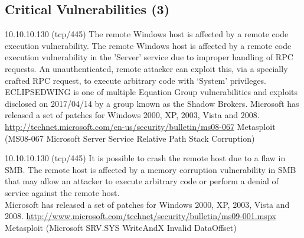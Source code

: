
\subsection{Critical Vulnerabilities (3)}
\begin{tcolorbox}[
	title=MS08-067: Microsoft Windows Server Service Crafted RPC Request Handling Remote Code Execution (958644) (uncredentialed check) - Nessus Plugin ID 34477,
	colback=red!5!white,%
	colframe=red!75!black,%
	subtitle style={boxrule=0.4pt, colback=red!50!white}%
	] 
	10.10.10.130 (tcp/445)
The remote Windows host is affected by a remote code execution vulnerability.
The remote Windows host is affected by a remote code execution vulnerability in the 'Server' service due to improper handling of RPC requests. An unauthenticated, remote attacker can exploit this, via a specially crafted RPC request, to execute arbitrary code with `System' privileges.\\
ECLIPSEDWING is one of multiple Equation Group vulnerabilities and exploits disclosed on 2017/04/14 by a group known as the Shadow Brokers.
Microsoft has released a set of patches for Windows 2000, XP, 2003, Vista and 2008.
\url{http://technet.microsoft.com/en-us/security/bulletin/ms08-067}
Metasploit (MS08-067 Microsoft Server Service Relative Path Stack Corruption) 
\end{tcolorbox}

\begin{tcolorbox}[
	title=MS09-001: Microsoft Windows SMB Vulnerabilities Remote Code Execution (958687) (uncredentialed check) - Nessus Plugin ID 35362,
	colback=red!5!white,
	colframe=red!75!black,
	subtitle style={boxrule=0.4pt, colback=red!50!white}	
	] 
	10.10.10.130 (tcp/445)
It is possible to crash the remote host due to a flaw in SMB.
The remote host is affected by a memory corruption vulnerability in SMB that may allow an attacker to execute arbitrary code or perform a denial of service against the remote host.\\
Microsoft has released a set of patches for Windows 2000, XP, 2003, Vista and 2008.
\url{http://www.microsoft.com/technet/security/bulletin/ms09-001.mspx}
Metasploit (Microsoft SRV.SYS WriteAndX Invalid DataOffset) 
\end{tcolorbox}

